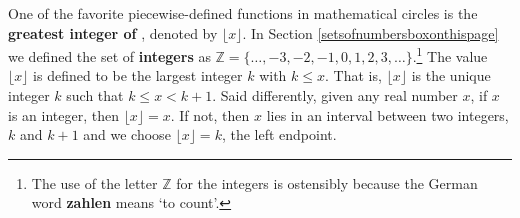 \documentclass{ximera}
\begin{document}
\begin{example}
\begin{explanation}
\begin{enumerate}
\begin{center}


\end{center}

\end{enumerate}

\end{explanation}

\end{example}

One of the favorite piecewise-defined functions in mathematical circles is the  \textbf{greatest integer of }, denoted by $\lfloor x \rfloor$. In Section \ref{setsofnumbersboxonthispage} we defined the set of \textbf{integers} as  $\mathbb{Z} = \{ \ldots, -3, -2, -1, 0, 1, 2, 3, \ldots\}$.\footnote{The use of the letter $\mathbb{Z}$ for the integers is ostensibly because the German word \textbf{zahlen} means `to count'.}  The value $\lfloor x \rfloor$  is defined to be the largest integer $k$ with $k \leq x$.  That is, $\lfloor x \rfloor$ is the unique integer $k$ such that $k \leq  x < k+1$.  Said differently, given any real number $x$, if $x$ is an integer, then  $\lfloor x \rfloor = x$.  If not, then $x$ lies in an interval between two integers, $k$ and $k+1$ and we choose  $\lfloor x \rfloor = k$, the left endpoint.
\end{document}
